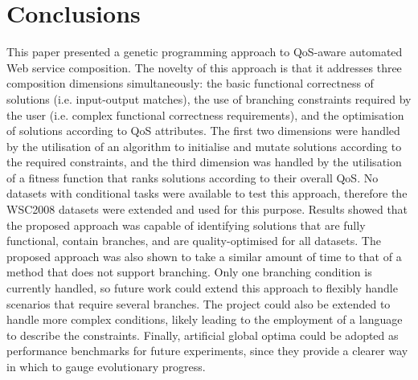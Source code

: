 \documentclass[conference]{IEEEtran}
\begin{document}
\section{Conclusions}\label{conclusion}
This paper presented a genetic programming approach to QoS-aware automated Web service composition. The novelty of this approach is that it addresses three composition dimensions simultaneously: the basic functional correctness of solutions (i.e. input-output matches), the use of branching constraints required by the user (i.e. complex functional correctness requirements), and the optimisation of solutions according to QoS attributes. The first two dimensions were handled by the utilisation of an algorithm to initialise and mutate solutions according to the required constraints, and the third dimension was handled by the utilisation of a fitness function that ranks solutions according to their overall QoS. No datasets with conditional tasks were available to test this approach, therefore the WSC2008 datasets were extended and used for this purpose. Results showed that the proposed approach was capable of identifying solutions that are fully functional, contain branches, and are quality-optimised for all datasets. The proposed approach was also shown to take a similar amount of time to that of a method that does not support branching. Only one branching condition is currently handled, so future work could extend this approach to flexibly handle scenarios that require several branches. The project could also be extended to handle more complex conditions, likely leading to the employment of a language to describe the constraints. Finally, artificial global optima could be adopted as performance benchmarks for future experiments, since they provide a clearer way in which to gauge evolutionary progress.





\end{document}
